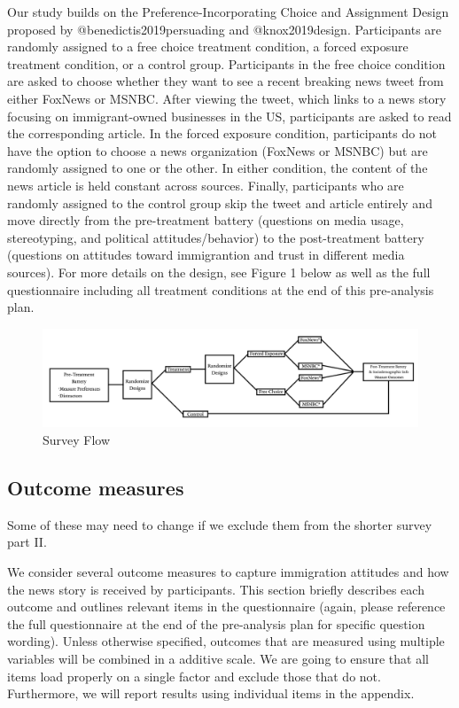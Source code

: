 \documentclass[
]{article}
\begin{document}
Our study builds on the Preference-Incorporating Choice and Assignment
Design proposed by @benedictis2019persuading and @knox2019design.
Participants are randomly assigned to a free choice treatment condition,
a forced exposure treatment condition, or a control group. Participants
in the free choice condition are asked to choose whether they want to
see a recent breaking news tweet from either FoxNews or MSNBC. After
viewing the tweet, which links to a news story focusing on
immigrant-owned businesses in the US, participants are asked to read the
corresponding article. In the forced exposure condition, participants do
not have the option to choose a news organization (FoxNews or MSNBC) but
are randomly assigned to one or the other. In either condition, the
content of the news article is held constant across sources. Finally,
participants who are randomly assigned to the control group skip the
tweet and article entirely and move directly from the pre-treatment
battery (questions on media usage, stereotyping, and political
attitudes/behavior) to the post-treatment battery (questions on
attitudes toward immigrantion and trust in different media sources). For
more details on the design, see Figure 1 below as well as the full
questionnaire including all treatment conditions at the end of this
pre-analysis plan.

\begin{figure}
\centering
\includegraphics{Lab-Graphic.jpg}
\caption{Survey Flow}
\end{figure}

\hypertarget{outcome-measures}{%
\subsection{Outcome measures}\label{outcome-measures}}

Some of these may need to change if we exclude them from the shorter
survey part II.

We consider several outcome measures to capture immigration attitudes
and how the news story is received by participants. This section briefly
describes each outcome and outlines relevant items in the questionnaire
(again, please reference the full questionnaire at the end of the
pre-analysis plan for specific question wording). Unless otherwise
specified, outcomes that are measured using multiple variables will be
combined in a additive scale. We are going to ensure that all items load
properly on a single factor and exclude those that do not. Furthermore,
we will report results using individual items in the appendix.
\end{document}
